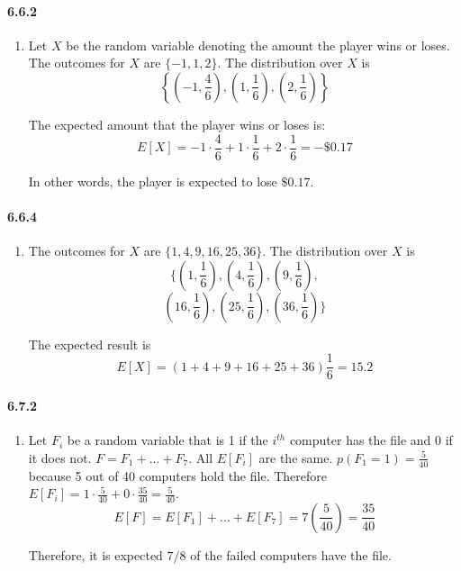 \documentclass[11pt, letterpaper, twocolumn, fleqn]{article}
\begin{document}
\paragraph{6.6.2}
\begin{enumerate}
  \item Let $X$ be the random variable denoting the amount the player wins or loses. The outcomes for $X$ are $\{-1,1,2\}$. The distribution over $X$ is 
    $$\left\{
      \left(-1,\frac{4}{6}\right),
      \left(1,\frac{1}{6}\right),
      \left(2 ,\frac{1}{6}\right)
    \right\}$$
    
  The expected amount that the player wins or loses is:
    $$E[X] = -1\cdot\frac{4}{6} + 1\cdot\frac{1}{6} + 2\cdot\frac{1}{6} = -\$0.17$$
    
  In other words, the player is expected to lose $\$0.17$.
\end{enumerate}

\paragraph{6.6.4}
\begin{enumerate}
  \item The outcomes for $X$ are $\{1,4,9,16,25,36\}$. The distribution over $X$ is 
    $$\bigg\{
      \left(1 ,\frac{1}{6}\right),
      \left(4 ,\frac{1}{6}\right),
      \left(9 ,\frac{1}{6}\right),$$
    $$\left(16,\frac{1}{6}\right),
      \left(25,\frac{1}{6}\right),
      \left(36,\frac{1}{6}\right)
    \bigg\}$$
    
  The expected result is 
    $$E[X] = (1 + 4 + 9 + 16 + 25 + 36)\frac{1}{6} = 15.2$$
\end{enumerate}

\paragraph{6.7.2}
\begin{enumerate}
  \item Let $F_i$ be a random variable that is 1 if the $i^{th}$ computer has the file and 0 if it does not. $F = F_1 + ... + F_7$. All $E[F_i]$ are the same. $p(F_1 = 1) = \frac{5}{40}$ because 5 out of 40 computers hold the file. Therefore $E[F_i] = 1\cdot\frac{5}{40} + 0 \cdot \frac{35}{40} = \frac{5}{40}$.
    $$E[F] = E[F_1] + ... + E[F_7] = 7 \left(\frac{5}{40}\right) = \frac{35}{40}$$
    
  Therefore, it is expected $7/8$ of the failed computers have the file.
\end{enumerate}
\end{document}
